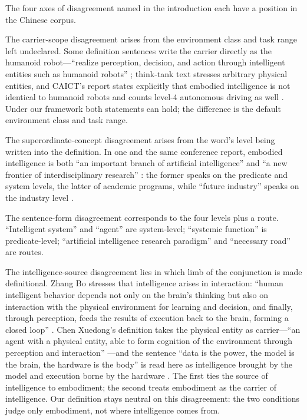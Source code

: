 \documentclass[10pt]{article}
\begin{document}
The four axes of disagreement named in the introduction each have a position in the Chinese corpus.

The carrier-scope disagreement arises from the environment class and task range left undeclared. Some definition sentences write the carrier directly as the humanoid robot---``realize perception, decision, and action through intelligent entities such as humanoid robots'' \cite{kejiribao2024}; think-tank text stresses arbitrary physical entities, and CAICT's report states explicitly that embodied intelligence is not identical to humanoid robots and counts level-4 autonomous driving as well \cite{caict2024}. Under our framework both statements can hold; the difference is the default environment class and task range.

The superordinate-concept disagreement arises from the word's level being written into the definition. In one and the same conference report, embodied intelligence is both ``an important branch of artificial intelligence'' and ``a new frontier of interdisciplinary research'' \cite{ia2025}: the former speaks on the predicate and system levels, the latter of academic programs, while ``future industry'' speaks on the industry level \cite{govreport2025}.

The sentence-form disagreement corresponds to the four levels plus a route. ``Intelligent system'' and ``agent'' are system-level; ``systemic function'' is predicate-level; ``artificial intelligence research paradigm'' and ``necessary road'' are routes.

The intelligence-source disagreement lies in which limb of the conjunction is made definitional. Zhang Bo stresses that intelligence arises in interaction: ``human intelligent behavior depends not only on the brain's thinking but also on interaction with the physical environment for learning and decision, and finally, through perception, feeds the results of execution back to the brain, forming a closed loop'' \cite{zhangbo2025}. Chen Xuedong's definition takes the physical entity as carrier---``an agent with a physical entity, able to form cognition of the environment through perception and interaction'' \cite{chenxd2026}---and the sentence ``data is the power, the model is the brain, the hardware is the body'' is read here as intelligence brought by the model and execution borne by the hardware \cite{chenxd2026}. The first ties the source of intelligence to embodiment; the second treats embodiment as the carrier of intelligence. Our definition stays neutral on this disagreement: the two conditions judge only embodiment, not where intelligence comes from.
\end{document}
